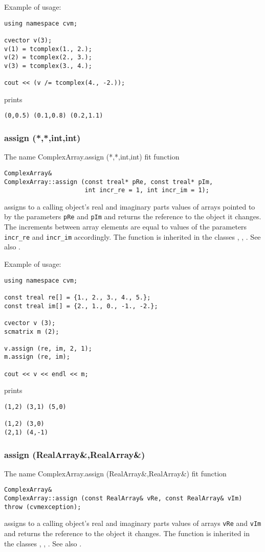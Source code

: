 Example of usage:
\begin{verbatim}
using namespace cvm;

cvector v(3);
v(1) = tcomplex(1., 2.);
v(2) = tcomplex(2., 3.);
v(3) = tcomplex(3., 4.);

cout << (v /= tcomplex(4., -2.));
\end{verbatim}
prints
\begin{verbatim}
(0,0.5) (0.1,0.8) (0.2,1.1)
\end{verbatim}
\newpage




\subsubsection{assign (*,*,int,int)}
The%
\pdfdest name {ComplexArray.assign (*,*,int,int)} fit{ }
function
\begin{verbatim}
ComplexArray&
ComplexArray::assign (const treal* pRe, const treal* pIm,
                      int incr_re = 1, int incr_im = 1);
\end{verbatim}
assigns to a calling object's real and imaginary parts
values of arrays pointed to by the parameters
\verb"pRe" and \verb"pIm" and returns the reference to
the object it changes. The increments between array elements
are equal to values of the parameters \verb"incr_re" and \verb"incr_im"
accordingly.
The function is inherited in the classes
,
,
.
See also .

Example of usage:
\begin{verbatim}
using namespace cvm;

const treal re[] = {1., 2., 3., 4., 5.};
const treal im[] = {2., 1., 0., -1., -2.};

cvector v (3);
scmatrix m (2);

v.assign (re, im, 2, 1);
m.assign (re, im);

cout << v << endl << m;
\end{verbatim}
prints
\begin{verbatim}
(1,2) (3,1) (5,0)

(1,2) (3,0)
(2,1) (4,-1)
\end{verbatim}
\newpage


\subsubsection{assign (RealArray\&,RealArray\&)}
The%
\pdfdest name {ComplexArray.assign (RealArray&,RealArray&)} fit{ }
function
\begin{verbatim}
ComplexArray&
ComplexArray::assign (const RealArray& vRe, const RealArray& vIm)
throw (cvmexception);
\end{verbatim}
assigns to a calling object's real and imaginary parts
values of arrays
\verb"vRe" and \verb"vIm" and returns the reference to
the object it changes.
The function is inherited in the classes
,
,
.
See also .

